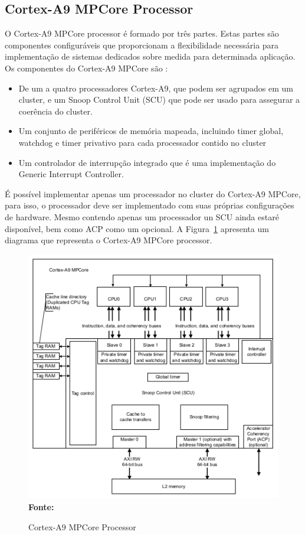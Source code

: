 \subsection{Cortex-A9 MPCore Processor}
O Cortex-A9 MPCore processor é formado por três partes. Estas partes são componentes configuráveis que proporcionam a flexibilidade necessária para implementação de sistemas dedicados sobre medida para determinada aplicação. Os componentes do Cortex-A9 MPCore são \cite{mpcore}:

\begin{itemize}
    \item De um a quatro processadores Cortex-A9, que podem ser agrupados em um cluster, e um Snoop Control Unit (SCU) que pode ser usado para assegurar a coerência do cluster.

    \item Um conjunto de periféricos de memória mapeada, incluindo timer global, watchdog e timer privativo para cada processador contido no cluster
    
    \item Um controlador de interrupção integrado que é uma implementação do Generic Interrupt Controller. 
\end{itemize}

É possível implementar apenas um processador no cluster do Cortex-A9 MPCore, para isso, o processador deve ser implementado com suas próprias configurações de hardware. Mesmo contendo apenas um processador un SCU ainda estaré disponível, bem como ACP como um opcional. A Figura~\ref{fig:mpcore} apresenta um diagrama que representa o Cortex-A9 MPCore processor.

\begin{figure}[ht]
	\caption{Cortex-A9 MPCore Processor}
	\begin{center}
		\includegraphics[scale=0.76]{imagens/mpcoreA9.png}\\
		{\small \textbf{Fonte:} }
    \end{center}\label{fig:mpcore}
\end{figure}

